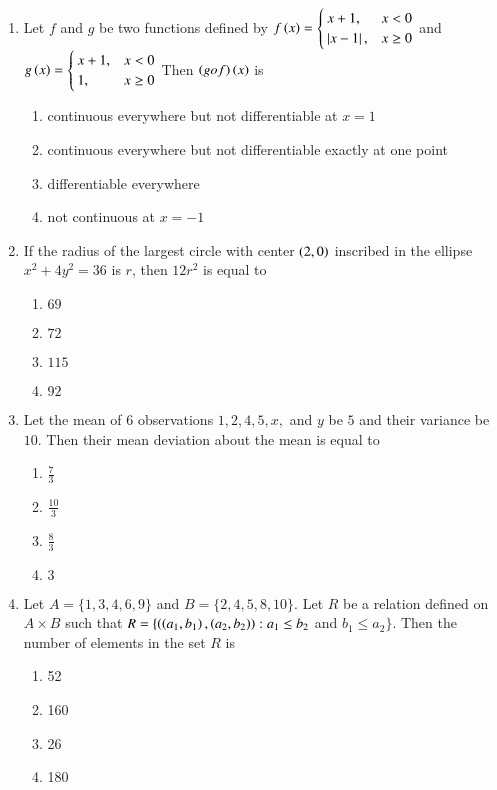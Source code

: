 \documentclass[journal,9pt,onecolumn]{IEEEtran}
\begin{document}
\begin{enumerate}
\item Let $f$ and $g$ be two functions defined by $f\left(x\right) = \begin{cases} 
x + 1, & x < 0 \\ 
\left\vert x - 1\right\vert, & x \geq 0 
\end{cases}$ and $g\left(x\right) = \begin{cases} 
x + 1, & x < 0 \\ 
1, & x \geq 0 
\end{cases}$ Then $\left(gof\right)\left(x\right)$ is 
\begin{enumerate}
    \item continuous everywhere but not differentiable at $x = 1$
    \item continuous everywhere but not differentiable exactly at one point
    \item differentiable everywhere
    \item not continuous at $x = -1$
\end{enumerate}


\item If the radius of the largest circle with center $\left(2, 0\right)$ inscribed in the ellipse $x^2 + 4y^2 = 36$ is $r$, then $12r^2$ is equal to
\begin{multicols}{4}
\begin{enumerate}
    \item $69$
    \item $72$
    \item $115$
    \item $92$
\end{enumerate}
\end{multicols}


\item Let the mean of 6 observations $1, 2, 4, 5, x,$ and $y$ be $5$ and their variance be $10$. Then their mean deviation about the mean is equal to
\begin{multicols}{4}
\begin{enumerate}
    \item $\frac{7}{3}$
    \item $\frac{10}{3}$
    \item $\frac{8}{3}$
    \item $3$
\end{enumerate}
\end{multicols}


\item Let $A = \{1, 3, 4, 6, 9\}$ and $B = \{2, 4, 5, 8, 10\}$. Let $R$ be a relation defined on $A \times B$ such that $R = \{\left(\left(a_1, b_1\right), \left(a_2, b_2\right)\right): a_1 \leq b_2$ and $b_1 \leq a_2\}.$ Then the number of elements in the set $R$ is 
\begin{multicols}{4}
\begin{enumerate}
    \item 52 
    \item 160 
    \item 26 
    \item 180 
\end{enumerate}
\end{multicols}




\end{enumerate}
\end{document}

